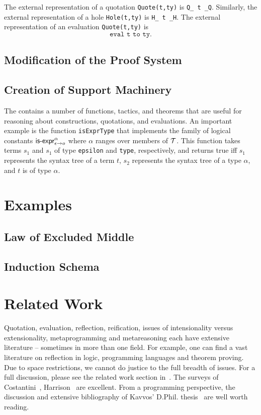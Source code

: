 \documentclass[fleqn]{llncs}
\begin{document}
The external representation of a quotation \texttt{Quote(t,ty)} is
\texttt{Q\_ t \_Q}.  Similarly, the external representation of a hole
\texttt{Hole(t,ty)} is \texttt{H\_ t \_H}.  The external
representation of an evaluation \texttt{Quote(t,ty)} is \[\texttt{eval
  t to ty}.\]

\subsection{Modification of the {\HL} Proof System}\label{subsec:proof-system}

\subsection{Creation of Support Machinery}\label{subsec:machinery}

The {\HLQE} contains a number of {\HOL} functions, tactics, and
theorems that are useful for reasoning about constructions,
quotations, and evaluations.  An important example is the {\HOL}
function \texttt{isExprType} that implements the {\churchqe} family
of logical constants $\mbox{\sf is-expr}_{\epsilon \rightarrow o}^{\alpha}$
where $\alpha$ ranges over members of $\mbox{$\cal T$}$.  This function takes
terms $s_1$ and $s_1$ of type \texttt{epsilon} and \texttt{type},
respectively, and returns true iff $s_1$ represents
the syntax tree of a term $t$, $s_2$ represents the syntax tree of a
type $\alpha$, and $t$ is of type $\alpha$.


\section{Examples}\label{sec:examples}

\subsection{Law of Excluded Middle}

\subsection{Induction Schema}

\section{Related Work}\label{sec:related-work}

Quotation, evaluation, reflection, reification, issues of
intensionality versus extensionality, metaprogramming and
metareasoning each have extensive literature -- sometimes
in more than one field.  For example, one can find a
vast literature on reflection in logic, programming languages
and theorem proving. Due to space restrictions, we cannot
do justice to the full breadth of issues. For a full discussion,
please see the related work section in~\cite{FarmerArxiv17}.
The surveys of Costantini~\cite{Costantini02},
Harrison~\cite{Harrison95} are excellent. From a
programming perspective, the discussion and extensive 
bibliography of Kavvos' D.Phil. thesis~\cite{Kavvos2017}
are well worth reading.
\end{document}
